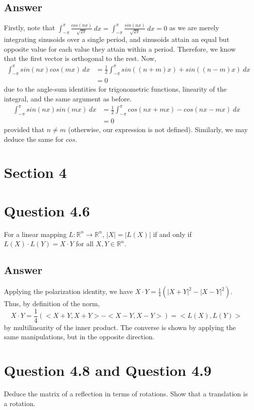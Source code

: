 \documentclass[
	12pt, %
]{fphw}
\begin{document}
\subsection*{Answer}
Firstly, note that $\int_{-\pi}^{\pi}\frac{cos(nx)}{\sqrt{2\pi}}  \ dx = \int_{-\pi}^{\pi}\frac{sin(nx)}{\sqrt{2\pi}} \ dx = 0 $ as we are merely integrating sinusoids over a single period, and sinusoids attain an equal but opposite value for each value they attain within a period. Therefore, we know that the first vector is orthogonal to the rest. 
Now, 
\begin{align}
	\int_{-\pi}^{\pi}sin(nx)cos(mx) \ dx & = \frac{1}{2}\int_{-\pi}^{\pi}sin((n+m)x)+sin((n-m)x) \ dx \\ 
&=0 
\end{align}
due to the angle-sum identities for trigonometric functions, linearity of the integral,  and the same argument as before.
\begin{align}
\int_{-\pi}^{\pi}sin(nx)sin(mx) \ dx &= \frac{1}{2}\int_{-\pi}^{\pi}cos(nx+mx)-cos(nx-mx) \ dx	\\
&= 0  
\end{align}
provided that $n\neq m$ (otherwise, our expression is not defined). Similarly, we may deduce the same for $cos$.
\section*{Section 4}
\section*{Question 4.6}
\begin{problem}
	For a linear mapping $L:\mathbb{R}^n \to \mathbb{R}^n$, $|X|=|L(X)|$ if and only if 
	$L(X) \cdot L(Y) = X \cdot Y$ for all $X,Y \in \mathbb{R}^n$.

	
\end{problem}
\subsection*{Answer}
Applying the polarization identity, we have $X \cdot Y=\frac{1}{4}(|X+Y|^2-|X-Y|^2)$. Thus, by definition of the norm, $$X \cdot Y=\frac{1}{4}(<X+Y,X+Y>-<X-Y,X-Y>)=<L(X),L(Y)>$$ by multilinearity of the inner product. The converse is shown by applying the same manipulations, but in the opposite direction.
\section*{Question 4.8 and Question 4.9}
\begin{problem}
	Deduce the matrix of a reflection in terms of rotations. Show that a translation is a rotation.
	
\end{problem}
\end{document}
